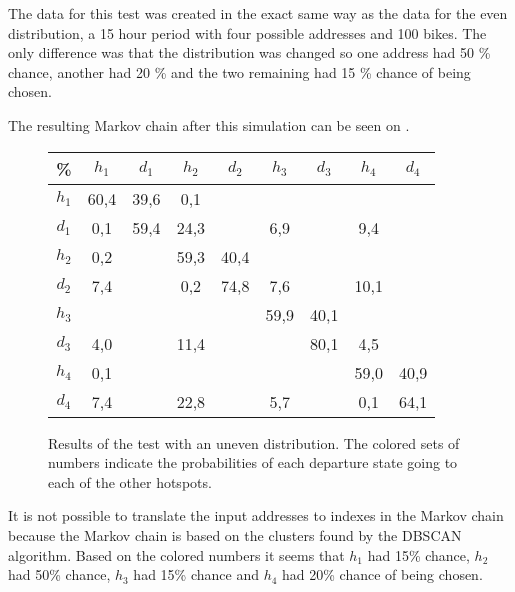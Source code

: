 The data for this test was created in the exact same way as the data for the even distribution, a 15 hour period with four possible addresses and 100 bikes.
The only difference was that the distribution was changed so one address had 50 \% chance, another had 20 \% and the two remaining had 15 \% chance of being chosen.

The resulting Markov chain after this simulation can be seen on .

\begin{figure}
	\centering
	\begin{tabular}{|c | c c c c c c c c|}
		\hline
		\% &      $ h_1 $ & $ d_1 $ & $ h_2 $ & $ d_2 $ & $ h_3 $ & $ d_3 $ & $ h_4 $ & $ d_4 $\\
		\hline
		$ h_1 $ & 60,4 &  39,6 &   0,1 &   &   &   &   &  \\
		$ d_1 $ & 0,1 &  59,4 &  {\color{red}24,3} &   &   {\color{red}6,9} &   &   {\color{red}9,4} &  \\
		$ h_2 $ & 0,2 &   &  59,3 &  40,4 &   &   &   &  \\
		$ d_2 $ & {\color{blue}7,4} &   &   0,2 &  74,8 &   {\color{blue}7,6} &   &  {\color{blue}10,1} &  \\
		$ h_3 $ & &   &   &   &  59,9 &  40,1 &   &  \\
		$ d_3 $ & {\color{orange}4,0} &   &  {\color{orange}11,4} &   &   &  80,1 &   {\color{orange}4,5} &  \\
		$ h_4 $ & 0,1 &   &   &   &   &   &  59,0 &  40,9\\
		$ d_4 $ & {\color{purple}7,4} &   &  {\color{purple}22,8} &   &   {\color{purple}5,7} &   &   0,1 &  64,1\\
		\hline
	\end{tabular}
	\caption{Results of the test with an uneven distribution. The colored sets of numbers indicate the probabilities of each departure state going to each of the other hotspots.}\label{test_uneven}
\end{figure}

It is not possible to translate the input addresses to indexes in the Markov chain because the Markov chain is based on the clusters found by the DBSCAN algorithm.
Based on the colored numbers it seems that $ h_1 $ had 15\% chance, $ h_2 $ had 50\% chance, $ h_3 $ had 15\% chance and $ h_4 $ had 20\% chance of being chosen.


